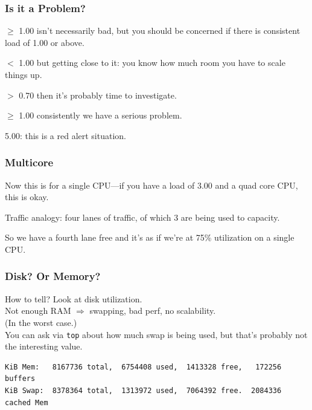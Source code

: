 \begin{frame}
\frametitle{Is it a Problem?}


\begin{changemargin}{1cm}
$\ge$ 1.00 isn't necessarily bad, but you should be concerned if there is consistent load of 1.00 or above. 

$<$ 1.00 but getting close to it: you know how much room you have to scale things up.

$>$ 0.70 then it's probably time to investigate.

$\ge$ 1.00 consistently we have a serious problem. 

5.00: this is a red alert situation.
\end{changemargin}

\end{frame}



\begin{frame}
\frametitle{Multicore}


\begin{changemargin}{1cm}
Now this is for a single CPU---if you have a load of 3.00 and a quad core CPU, this is okay. 

Traffic analogy: four lanes of traffic, of which 3 are being used to capacity.

So we have a fourth lane free and it's as if we're at 75\% utilization on a single CPU.
\end{changemargin}

\end{frame}


\begin{frame}[fragile]
\frametitle{Disk? Or Memory?}


\begin{changemargin}{1cm}
How to tell? Look at disk utilization. \\[1em]

Not enough RAM $\Rightarrow$ swapping, bad perf, no scalability.\\[1em]

(In the worst case.)\\[1em]

You can ask via \texttt{top} about how much swap is being used, but that's probably not the interesting value. 

{\scriptsize
\begin{verbatim}
KiB Mem:   8167736 total,  6754408 used,  1413328 free,   172256 buffers
KiB Swap:  8378364 total,  1313972 used,  7064392 free.  2084336 cached Mem
\end{verbatim}
}
\end{changemargin}

\end{frame}



